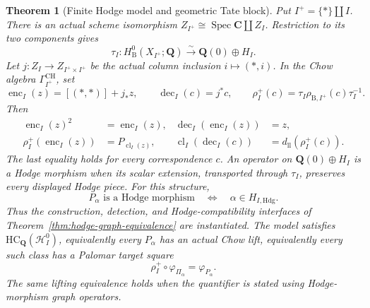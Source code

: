 \documentclass[11pt]{article}
\newtheorem{theorem}{Theorem}[section]
\theoremstyle{definition}
\theoremstyle{remark}
\DeclareMathOperator{\Spec}{Spec}
\newcommand{\Q}{\mathbf Q}
\begin{document}
\begin{theorem}[Finite Hodge model and geometric Tate block]
Put \(I^+=\{*\}\amalg I\).  There is an actual scheme isomorphism
\(Z_{I^+}\cong\Spec\mathbf C\amalg Z_I\).  Restriction to its two
components gives
\[
 \tau_I:H^0_{\mathrm B}(X_{I^+};\Q)
       \xrightarrow{\sim}\Q(0)\oplus H_I.
\]
Let \(j:Z_I\to Z_{I^+\times I^+}\) be the actual column inclusion
\(i\mapsto(*,i)\).  In the Chow algebra
\(\Gamma_{I^+}^{\mathrm{CH}}\), set
\[
 \operatorname{enc}_I(z)=[(*,*)]+j_*z,
 \qquad \operatorname{dec}_I(c)=j^*c,
 \qquad
 \rho_I^+(c)=\tau_I\rho_{\mathrm B,I^+}(c)\tau_I^{-1}.
\]
Then
\[
 \begin{aligned}
 \operatorname{enc}_I(z)^2&=\operatorname{enc}_I(z),
 &\operatorname{dec}_I(\operatorname{enc}_I(z))&=z,\\
 \rho_I^+(\operatorname{enc}_I(z))&=P_{\operatorname{cl}_I(z)},
 &\operatorname{cl}_I(\operatorname{dec}_I(c))
   &=d_{\mathrm{ll}}(\rho_I^+(c)).
 \end{aligned}
\]
The last equality holds for every correspondence \(c\).
An operator on \(\Q(0)\oplus H_I\) is a Hodge morphism when its
scalar extension, transported through \(\tau_I\), preserves every
displayed Hodge piece.  For this structure,
\[
 P_\alpha\text{ is a Hodge morphism}
   \quad\Longleftrightarrow\quad \alpha\in H_{I,\mathrm{Hdg}}.
\]
Thus the construction, detection, and Hodge-compatibility interfaces of
Theorem~\ref{thm:hodge-graph-equivalence} are instantiated.
The model satisfies \(\mathrm{HC}_{\Q}(\mathscr H_I^0)\), equivalently
every \(P_\alpha\) has an actual Chow lift, equivalently every such
class has a Palomar target square
\[
 \rho_I^+\circ\varphi_{\Pi_\alpha}
    =\varphi_{P_\alpha}.
\]
The same lifting equivalence holds when the quantifier is stated using
Hodge-morphism graph operators.
\end{theorem}
\end{document}
